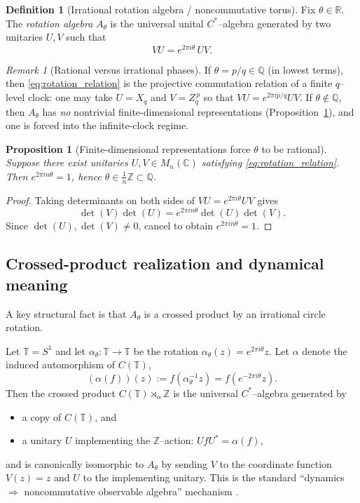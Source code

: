 \documentclass[11pt,oneside]{amsbook}
\numberwithin{equation}{section}
\theoremstyle{plain}
\newtheorem{proposition}[theorem]{Proposition}
\theoremstyle{definition}
\newtheorem{definition}[theorem]{Definition}
\theoremstyle{remark}
\newtheorem{remark}[theorem]{Remark}
\newcommand{\Z}{\mathbb{Z}}
\newcommand{\Q}{\mathbb{Q}}
\newcommand{\R}{\mathbb{R}}
\newcommand{\C}{\mathbb{C}}
\begin{document}
\begin{definition}[Irrational rotation algebra / noncommutative torus]
Fix $\theta\in\R$.
The \emph{rotation algebra} $A_\theta$ is the universal unital $C^*$--algebra generated by two unitaries $U,V$ such that
\begin{equation}
\label{eq:rotation_relation}
VU = e^{2\pi i \theta}\, UV .
\end{equation}
\end{definition}

\begin{remark}[Rational versus irrational phases]
If $\theta=p/q\in\Q$ (in lowest terms), then \eqref{eq:rotation_relation} is the projective commutation relation of a finite $q$--level clock:
one may take $U=X_q$ and $V=Z_q^{\,p}$ so that $VU=e^{2\pi i p/q}UV$.
If $\theta\notin\Q$, then $A_\theta$ has \emph{no} nontrivial finite-dimensional representations (Proposition~\ref{prop:finite_rep_implies_rational}), and one is forced into the infinite-clock regime.
\end{remark}

\begin{proposition}[Finite-dimensional representations force $\theta$ to be rational]
\label{prop:finite_rep_implies_rational}
Suppose there exist unitaries $U,V\in M_n(\C)$ satisfying \eqref{eq:rotation_relation}.
Then $e^{2\pi i n\theta}=1$, hence $\theta\in \frac1n\Z\subset\Q$.
\end{proposition}

\begin{proof}
Taking determinants on both sides of $VU=e^{2\pi i\theta}UV$ gives
\[
\det(V)\det(U)=e^{2\pi i n\theta}\det(U)\det(V).
\]
Since $\det(U),\det(V)\neq 0$, cancel to obtain $e^{2\pi i n\theta}=1$.
\end{proof}

\subsection{Crossed-product realization and dynamical meaning}
A key structural fact is that $A_\theta$ is a crossed product by an irrational circle rotation.

Let $\mathbb{T}=S^1$ and let $\alpha_\theta:\mathbb{T}\to\mathbb{T}$ be the rotation $\alpha_\theta(z)=e^{2\pi i\theta}z$.
Let $\alpha$ denote the induced automorphism of $C(\mathbb{T})$,
\[
(\alpha(f))(z):=f(\alpha_\theta^{-1}z)=f(e^{-2\pi i\theta}z).
\]
Then the crossed product $C(\mathbb{T})\rtimes_\alpha \Z$ is the universal $C^*$--algebra generated by
\begin{itemize}
\item a copy of $C(\mathbb{T})$, and
\item a unitary $U$ implementing the $\Z$--action: $U f U^*=\alpha(f)$,
\end{itemize}
and is canonically isomorphic to $A_\theta$ by sending $V$ to the coordinate function $V(z)=z$ and $U$ to the implementing unitary.
This is the standard ``dynamics $\Rightarrow$ noncommutative observable algebra'' mechanism \cite{PimsnerVoiculescu1980ExactSequence,Rieffel1981IrrationalRotations}.
\end{document}
